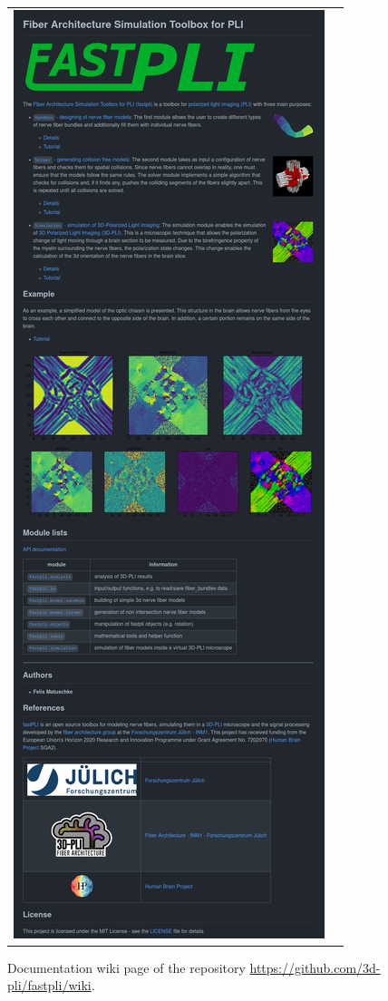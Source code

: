 \begin{figure}[!t]
{{\begin{tabular}{c|c}
 	\includegraphics[valign=T,trim=0 0 0 1580, clip]{gfx/fastpli/fastpli_wiki.png} \\
    \end{tabular}
    }}
	\caption{Documentation wiki page of the  repository \url{https://github.com/3d-pli/fastpli/wiki}.}
	\label{fig:fastpli_wiki}
\end{figure}
